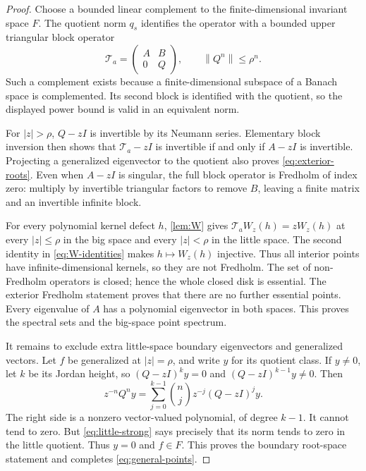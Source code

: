 \documentclass[11pt,a4paper]{article}
\numberwithin{equation}{section}
\theoremstyle{definition}
\theoremstyle{remark}
\newcommand{\Ta}{\mathcal T_a}
\newcommand{\norm}[1]{\left\lVert#1\right\rVert}
\begin{document}
\begin{proof}
Choose a bounded linear complement to the finite-dimensional invariant
space $F$. The quotient norm $q_s$ identifies the operator with a
bounded upper triangular block operator
\begin{equation}
 \Ta=\begin{pmatrix}A&B\\0&Q\end{pmatrix},
 \qquad \norm{Q^n}\le\rho^n.
 \label{eq:blocks}
\end{equation}
Such a complement exists because a finite-dimensional subspace of a
Banach space is complemented. Its second block is identified with the
quotient, so the displayed power bound is valid in an equivalent norm.

For $|z|>\rho$, $Q-zI$ is invertible by its Neumann series. Elementary
block inversion then shows that $\Ta-zI$ is invertible if and only if
$A-zI$ is invertible. Projecting a generalized eigenvector to the
quotient also proves \eqref{eq:exterior-roots}. Even when $A-zI$ is
singular, the full block operator is Fredholm of index zero: multiply
by invertible triangular factors to remove $B$, leaving a finite matrix
and an invertible infinite block.

For every polynomial kernel defect $h$, \cref{lem:W} gives
$\Ta W_z(h)=zW_z(h)$ at every $|z|\le\rho$ in the big space and every
$|z|<\rho$ in the little space. The second identity in
\eqref{eq:W-identities} makes $h\mapsto W_z(h)$ injective.
Thus all interior points have infinite-dimensional kernels, so they are
not Fredholm. The set of non-Fredholm operators is closed; hence the
whole closed disk is essential. The exterior Fredholm statement proves
that there are no further essential points. Every eigenvalue of $A$
has a polynomial eigenvector in both spaces. This proves the spectral
sets and the big-space point spectrum.

It remains to exclude extra little-space boundary eigenvectors and
generalized vectors. Let $f$ be generalized at $|z|=\rho$, and write
$y$ for its quotient class. If $y\ne0$, let $k$ be its Jordan height,
so $(Q-zI)^ky=0$ and $(Q-zI)^{k-1}y\ne0$. Then
\begin{equation}
 z^{-n}Q^ny
 =\sum_{j=0}^{k-1}\binom nj z^{-j}(Q-zI)^jy.
 \label{eq:jordan-growth}
\end{equation}
The right side is a nonzero vector-valued polynomial, of degree $k-1$.
It cannot tend to zero. But \eqref{eq:little-strong} says precisely
that its norm tends to zero in the little quotient. Thus $y=0$ and
$f\in F$. This proves the boundary root-space statement and completes
\eqref{eq:general-points}.
\end{proof}
\end{document}

